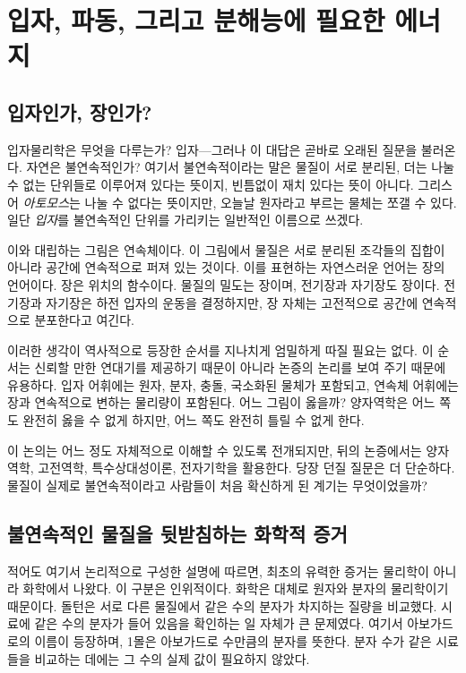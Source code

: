 \chapter{입자, 파동, 그리고 분해능에 필요한 에너지}

\section{입자인가, 장인가?}

입자물리학은 무엇을 다루는가? 입자---그러나 이 대답은 곧바로 오래된 질문을 불러온다. 자연은 불연속적인가? 여기서 불연속적이라는 말은 물질이 서로 분리된, 더는 나눌 수 없는 단위들로 이루어져 있다는 뜻이지, 빈틈없이 재치 있다는 뜻이 아니다. 그리스어 \emph{아토모스}는 나눌 수 없다는 뜻이지만, 오늘날 원자라고 부르는 물체는 쪼갤 수 있다. 일단 \emph{입자}를 불연속적인 단위를 가리키는 일반적인 이름으로 쓰겠다.

이와 대립하는 그림은 연속체이다. 이 그림에서 물질은 서로 분리된 조각들의 집합이 아니라 공간에 연속적으로 퍼져 있는 것이다. 이를 표현하는 자연스러운 언어는 장의 언어이다. 장은 위치의 함수이다. 물질의 밀도는 장이며, 전기장과 자기장도 장이다. 전기장과 자기장은 하전 입자의 운동을 결정하지만, 장 자체는 고전적으로 공간에 연속적으로 분포한다고 여긴다.

이러한 생각이 역사적으로 등장한 순서를 지나치게 엄밀하게 따질 필요는 없다. 이 순서는 신뢰할 만한 연대기를 제공하기 때문이 아니라 논증의 논리를 보여 주기 때문에 유용하다. 입자 어휘에는 원자, 분자, 충돌, 국소화된 물체가 포함되고, 연속체 어휘에는 장과 연속적으로 변하는 물리량이 포함된다. 어느 그림이 옳을까? 양자역학은 어느 쪽도 완전히 옳을 수 없게 하지만, 어느 쪽도 완전히 틀릴 수 없게 한다.

이 논의는 어느 정도 자체적으로 이해할 수 있도록 전개되지만, 뒤의 논증에서는 양자역학, 고전역학, 특수상대성이론, 전자기학을 활용한다. 당장 던질 질문은 더 단순하다. 물질이 실제로 불연속적이라고 사람들이 처음 확신하게 된 계기는 무엇이었을까?

\section{불연속적인 물질을 뒷받침하는 화학적 증거}

적어도 여기서 논리적으로 구성한 설명에 따르면, 최초의 유력한 증거는 물리학이 아니라 화학에서 나왔다. 이 구분은 인위적이다. 화학은 대체로 원자와 분자의 물리학이기 때문이다. 돌턴은 서로 다른 물질에서 같은 수의 분자가 차지하는 질량을 비교했다. 시료에 같은 수의 분자가 들어 있음을 확인하는 일 자체가 큰 문제였다. 여기서 아보가드로의 이름이 등장하며, 1몰은 아보가드로 수만큼의 분자를 뜻한다. 분자 수가 같은 시료들을 비교하는 데에는 그 수의 실제 값이 필요하지 않았다.

